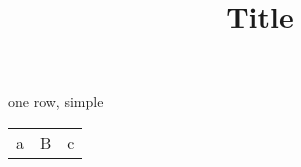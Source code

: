 \documentclass{article}
\title{Title}
\begin{document}
one row, simple
\begin{tabular}{ccc}
a&B&c
\end{tabular}
\end{document}
